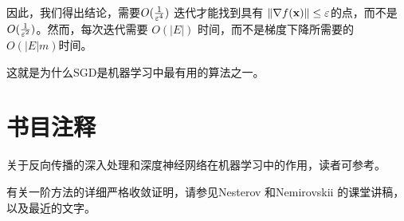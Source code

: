 
因此，我们得出结论，需要$O(\frac{1}{\varepsilon^4})$ 迭代才能找到具有 $\|\nabla f(\mathbf x)\| \leq \varepsilon$的点，而不是 $O(\frac{1}{\varepsilon^2})$。然而，每次迭代需要 $O(|E|)$ 时间，而不是梯度下降所需要的 $O(|E| m)$时间。

这就是为什么SGD是机器学习中最有用的算法之一。




\newpage
\section{
书目注释
}



关于反向传播的深入处理和深度神经网络在机器学习中的作用，读者可参考\cite{Goodfellow-et-al-2016}。

有关一阶方法的详细严格收敛证明，请参见Nesterov \cite{NesterovBook} 和Nemirovskii \cite{NY83,Nemirovski04lectures}的课堂讲稿，以及最近的文字\cite{bubeckOPT}。











